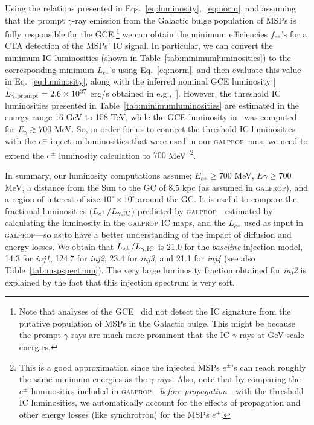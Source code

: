 \documentclass[doublespace,draft,nopageskip]{VTthesis} %
\begin{document}
 Using the relations presented in Eqs.~\ref{eq:luminosity},~\ref{eq:norm}, and assuming that the prompt $\gamma$-ray emission from the Galactic bulge population of MSPs is fully responsible for the GCE,\footnote{Note that analyses of the  
 GCE~\citep{Lacroix:2015wfx} did not detect the IC signature from the putative population of MSPs in the Galactic bulge. This might be because the prompt $\gamma$ rays are much more prominent that the IC $\gamma$ rays at GeV scale energies.}  we can obtain the minimum efficiencies $f_{e^\pm}$'s for a CTA detection of the MSPs' IC signal. In particular, we can convert the minimum IC luminosities (shown in Table~\ref{tab:minimumluminosities}) to the corresponding minimum $L_{e^\pm}$'s using Eq.~\ref{eq:norm}, and then evaluate this value in  Eq.~\ref{eq:luminosity}, along with the inferred nominal GCE luminosity [$L_{\gamma, {\rm prompt}}=2.6\times 10^{37}$ erg/s obtained in e.g.,~\citet{Macias:2019omb}]. However, the threshold IC luminosities presented in Table~\ref{tab:minimumluminosities} are estimated in the energy range 16 GeV to 158 TeV, while the GCE luminosity in~\citet{Macias:2019omb} was computed for $E_{\gamma} \gtrsim 700$ MeV. So, in order for us to connect the threshold IC luminosities with the $e^\pm$ injection luminosities that were used in our \textsc{galprop} runs, we need to extend the $e^\pm$ luminosity calculation to $700$ MeV~\footnote{This is a good approximation since the injected MSPs $e^\pm$'s can reach roughly the same minimum energies as the $\gamma$-rays. Also, note that by comparing the $e^\pm$ luminosities included in \textsc{galprop}---\textit{before propagation}---with the threshold IC luminosities, we automatically account for the effects of propagation and other energy losses (like synchrotron) for the MSPs $e^\pm$.}. 

In summary, our luminosity computations assume; $E_{e^\pm}\geq700$ MeV, $E{\gamma}\geq700$ MeV, a distance from the Sun to the GC of $8.5$ kpc (as assumed in \textsc{galprop}), and a region of interest of size $10^\circ\times10^\circ$ around the GC. It is useful to compare the fractional luminosities ($L_{e^\pm}/L_{\gamma, {\rm IC}}$) predicted by \textsc{galprop}---estimated by calculating the luminosity in the \textsc{galprop} IC maps, and the $L_{e^\pm}$ used as input in \textsc{galprop}---so as to have a better understanding of the impact of diffusion and energy losses. We obtain that $L_{e^\pm}/L_{\gamma, {\rm IC}}$ is 21.0 for the \textit{baseline} injection model, 14.3 for \textit{inj1}, 124.7 for \textit{inj2}, 23.4 for \textit{inj3}, and 21.1 for \textit{inj4} (see also Table~\ref{tab:mspspectrum}). The very large luminosity fraction obtained for \textit{inj2} is explained by the fact that this injection spectrum is very soft.       
\end{document}
